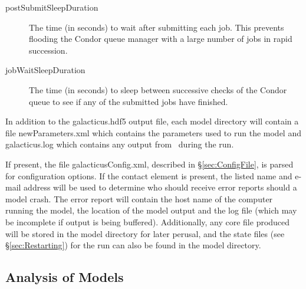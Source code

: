 \begin{description}
\begin{description}
\item[{\normalfont \ttfamily postSubmitSleepDuration}] The time (in seconds) to wait after submitting each job. This prevents flooding the Condor queue manager with a large number of jobs in rapid succession.
\item[{\normalfont \ttfamily jobWaitSleepDuration}] The time (in seconds) to sleep between successive checks of the Condor queue to see if any of the submitted jobs have finished.
\end{description}

\end{description}

In addition to the {\normalfont \ttfamily galacticus.hdf5} output file, each model directory will contain a file {\normalfont \ttfamily newParameters.xml} which contains the parameters used to run the model and {\normalfont \ttfamily galacticus.log} which contains any output from \glc\ during the run.

If present, the file {\normalfont \ttfamily galacticusConfig.xml}, described in \S\ref{sec:ConfigFile}, is parsed for configuration options. If the {\normalfont \ttfamily contact} element is present, the listed name and e-mail address will be used to determine who should receive error reports should a model crash. The error report will contain the host name of the computer running the model, the location of the model output and the log file (which may be incomplete if output is being buffered). Additionally, any core file produced will be stored in the model directory for later perusal, and the state files (see \S\ref{sec:Restarting}) for the run can also be found in the model directory.

\subsection{Analysis of Models}\label{sec:AnalysisScripts}

